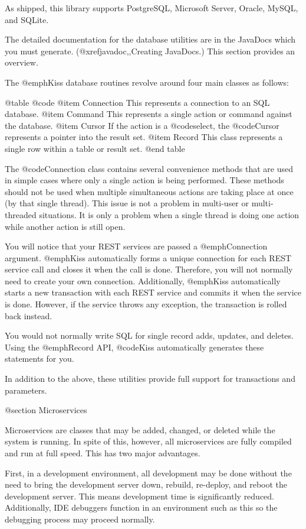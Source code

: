 As shipped, this library supports PostgreSQL, Microsoft Server,
Oracle, MySQL, and SQLite.

The detailed documentation for the database utilities are in the
JavaDocs which you must generate. (@xref{javadoc,,Creating JavaDocs}.)
This section provides an overview.

The @emph{Kiss} database routines revolve around four main classes as follows:

@table @code
@item Connection
This represents a connection to an SQL database.
@item Command
This represents a single action or command against the database.
@item Cursor
If the action is a @code{select}, the @code{Cursor} represents a
pointer into the result set.
@item Record
This class represents a single row within a table or result set.
@end table

The @code{Connection} class contains several convenience methods that
are used in simple cases where only a single action is being
performed.  These methods should not be used when multiple
simultaneous actions are taking place at once (by that single thread).
This issue is not a problem in multi-user or multi-threaded
situations.  It is only a problem when a single thread is doing one
action while another action is still open.

You will notice that your REST services are passed a @emph{Connection}
argument.  @emph{Kiss} automatically forms a unique connection for
each REST service call and closes it when the call is done.
Therefore, you will not normally need to create your own connection.
Additionally, @emph{Kiss} automatically starts a new transaction with
each REST service and commits it when the service is done.  However,
if the service throws any exception, the transaction is rolled back
instead.

You would not normally write SQL for single record adds, updates, and
deletes.  Using the @emph{Record} API, @code{Kiss} automatically
generates these statements for you.

In addition to the above, these utilities provide full support for transactions and parameters.

@section Microservices

Microservices are classes that may be added, changed, or deleted while
the system is running.  In spite of this, however, all microservices
are fully compiled and run at full speed.  This has two major advantages.

First, in a development environment, all development may be done without 
the need to bring the development server down, rebuild, re-deploy, and reboot
the development server.  This means development time is significantly reduced.
Additionally, IDE debuggers function in an environment such as this so
the debugging process may proceed normally.

